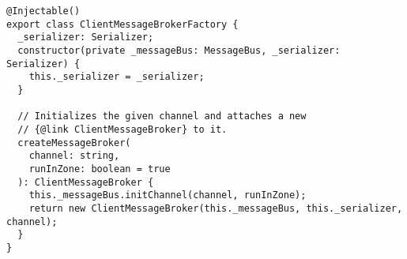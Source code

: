 \begin{verbatim}
@Injectable()
export class ClientMessageBrokerFactory {
  _serializer: Serializer;
  constructor(private _messageBus: MessageBus, _serializer: Serializer) {
    this._serializer = _serializer;
  }

  // Initializes the given channel and attaches a new
  // {@link ClientMessageBroker} to it.
  createMessageBroker(
    channel: string,
    runInZone: boolean = true
  ): ClientMessageBroker {
    this._messageBus.initChannel(channel, runInZone);
    return new ClientMessageBroker(this._messageBus, this._serializer, channel);
  }
}
\end{verbatim}
